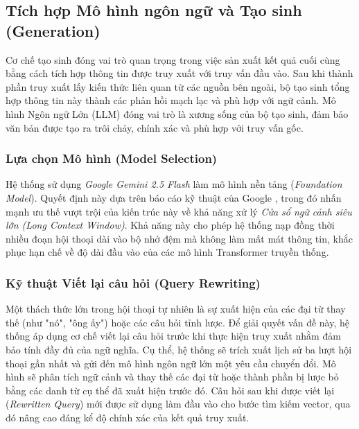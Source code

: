 
\subsection{Tích hợp Mô hình ngôn ngữ và Tạo sinh (Generation)}
\label{subsec:generation}

Cơ chế tạo sinh đóng vai trò quan trọng trong việc sản xuất kết quả cuối cùng bằng cách tích hợp thông tin được truy xuất với truy vấn đầu vào. Sau khi thành phần truy xuất lấy kiến thức liên quan từ các nguồn bên ngoài, bộ tạo sinh tổng hợp thông tin này thành các phản hồi mạch lạc và phù hợp với ngữ cảnh. Mô hình Ngôn ngữ Lớn (LLM) đóng vai trò là xương sống của bộ tạo sinh, đảm bảo văn bản được tạo ra trôi chảy, chính xác và phù hợp với truy vấn gốc.

\subsubsection{Lựa chọn Mô hình (Model Selection)}
Hệ thống sử dụng \textit{Google Gemini 2.5 Flash} làm mô hình nền tảng (\textit{Foundation Model}). Quyết định này dựa trên báo cáo kỹ thuật của Google \cite{team2024gemini}, trong đó nhấn mạnh ưu thế vượt trội của kiến trúc này về khả năng xử lý \textit{Cửa sổ ngữ cảnh siêu lớn (Long Context Window)}. Khả năng này cho phép hệ thống nạp đồng thời nhiều đoạn hội thoại dài vào bộ nhớ đệm mà không làm mất mát thông tin, khắc phục hạn chế về độ dài đầu vào của các mô hình Transformer truyền thống.

\subsubsection{Kỹ thuật Viết lại câu hỏi (Query Rewriting)}
Một thách thức lớn trong hội thoại tự nhiên là sự xuất hiện của các đại từ thay thế (như "nó", "ông ấy") hoặc các câu hỏi tỉnh lược. Để giải quyết vấn đề này, hệ thống áp dụng cơ chế viết lại câu hỏi trước khi thực hiện truy xuất nhằm đảm bảo tính đầy đủ của ngữ nghĩa. Cụ thể, hệ thống sẽ trích xuất lịch sử ba lượt hội thoại gần nhất và gửi đến mô hình ngôn ngữ lớn một yêu cầu chuyển đổi. Mô hình sẽ phân tích ngữ cảnh và thay thế các đại từ hoặc thành phần bị lược bỏ bằng các danh từ cụ thể đã xuất hiện trước đó. Câu hỏi sau khi được viết lại (\textit{Rewritten Query}) mới được sử dụng làm đầu vào cho bước tìm kiếm vector, qua đó nâng cao đáng kể độ chính xác của kết quả truy xuất.


